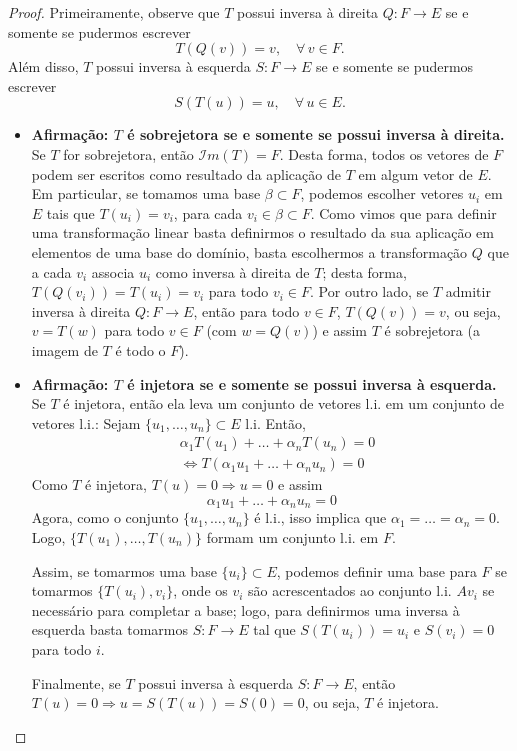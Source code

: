\begin{proof}
Primeiramente, observe que $T$ possui inversa à direita $Q:F\to E$ se e somente se pudermos escrever
\begin{equation}
	T(Q(v)) = v, \quad \forall \, v \in F.
\end{equation}
Além disso, $T$ possui inversa à esquerda $S:F\to E$ se e somente se pudermos escrever
\begin{equation}
   S(T(u)) = u, \quad \forall \, u \in E.
\end{equation}
\begin{itemize}
   \item \textbf{Afirmação: $T$ é sobrejetora se e somente se possui inversa à direita.} Se $T$ for sobrejetora, então ${\mathcal{I}}m(T) = F$. Desta forma, todos os vetores de $F$ podem ser escritos como resultado da aplicação de $T$ em algum vetor de $E$. Em particular, se tomamos uma base $\beta \subset F$, podemos escolher vetores $u_i$ em $E$ tais que $T(u_i)=v_i$, para cada $v_i\in \beta\subset F$. Como vimos que para definir uma transformação linear basta definirmos o resultado da sua aplicação em elementos de uma base do domínio, basta escolhermos a transformação $Q$ que a cada $v_i$ associa $u_i$ como inversa à direita de $T$; desta forma, $T(Q(v_i)) = T(u_i) = v_i$ para todo $v_i \in F$. Por outro lado, se $T$ admitir inversa à direita $Q:F\rightarrow E$, então para todo $v\in F$, $T(Q(v)) = v$, ou seja, $v=T(w)$ para todo $v \in F$ (com $w=Q(v)$) e assim $T$ é sobrejetora (a imagem de $T$ é todo o $F$). 
   
   \item \textbf{Afirmação: $T$ é injetora se e somente se possui inversa à esquerda.} Se $T$ é injetora, então ela leva um conjunto de vetores l.i. em um conjunto de vetores l.i.: Sejam $\{ u_1,\ldots,u_n\}\subset E$ l.i. Então, 
   \begin{align*}
      &\alpha_1T(u_1)+\ldots+\alpha_nT(u_n)=0 \\
      &\Leftrightarrow T(\alpha_1u_1+\ldots+\alpha_nu_n)=0
   \end{align*}
   Como $T$ é injetora, $T(u)=0 \Rightarrow u=0$ e assim
   \begin{equation*}
      \alpha_1u_1+\ldots+\alpha_nu_n = 0
   \end{equation*}
   Agora, como o conjunto $\{ u_1,\ldots,u_n\}$ é l.i., isso implica que $\alpha_1=\ldots=\alpha_n = 0$. Logo, $\{T(u_1),\ldots,T(u_n)\}$ formam um conjunto l.i. em $F$.

   Assim, se tomarmos uma base $\{u_i\} \subset E$, podemos definir uma base para $F$ se tomarmos $\{T(u_i),v_i\}$, onde os $v_i$ são acrescentados ao conjunto l.i. $Av_i$ se necessário para completar a base; logo, para definirmos uma inversa à esquerda basta tomarmos $S:F\to E$ tal que $S(T(u_i))=u_i$ e $S(v_i)=0$ para todo $i$.
   
   Finalmente, se $T$ possui inversa à esquerda $S:F\rightarrow E$, então $T(u)=0 \Rightarrow u = S(T(u))=S(0)=0$, ou seja, $T$ é injetora.
\end{itemize}
\end{proof}

